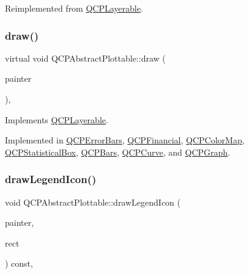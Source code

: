 Reimplemented from \mbox{\hyperlink{class_q_c_p_layerable_ae546370644a5551c76af739afc008bee}{Q\+C\+P\+Layerable}}.

\mbox{\label{class_q_c_p_abstract_plottable_a453f676a5cee7bf846c5f0fa05ea84b3}} 
\subsubsection{\texorpdfstring{draw()}{draw()}}
{\footnotesize\ttfamily virtual void Q\+C\+P\+Abstract\+Plottable\+::draw (\begin{DoxyParamCaption}\item[{\mbox{\hyperlink{class_q_c_p_painter}{Q\+C\+P\+Painter}} $\ast$}]{painter }\end{DoxyParamCaption})\hspace{0.3cm}{\ttfamily [protected]}, {}}



Implements \mbox{\hyperlink{class_q_c_p_layerable_aecf2f7087482d4b6a78cb2770e5ed12d}{Q\+C\+P\+Layerable}}.



Implemented in \mbox{\hyperlink{class_q_c_p_error_bars_a801e85931372abf2a1034bfb2eac5cd2}{Q\+C\+P\+Error\+Bars}}, \mbox{\hyperlink{class_q_c_p_financial_a4d62b7a618d609321adb5f5f1e31f446}{Q\+C\+P\+Financial}}, \mbox{\hyperlink{class_q_c_p_color_map_a6b628014d2939368935efd0a788648c8}{Q\+C\+P\+Color\+Map}}, \mbox{\hyperlink{class_q_c_p_statistical_box_afcff35fa79728cfe10e80e0702014fea}{Q\+C\+P\+Statistical\+Box}}, \mbox{\hyperlink{class_q_c_p_bars_aa267c20650d55084c3f47cb2f8fac9dc}{Q\+C\+P\+Bars}}, \mbox{\hyperlink{class_q_c_p_curve_ac199d41d23865cd68bd7b598308a4433}{Q\+C\+P\+Curve}}, and \mbox{\hyperlink{class_q_c_p_graph_a2b0849598f06e834b43ce18cd13bcdc3}{Q\+C\+P\+Graph}}.

\mbox{\label{class_q_c_p_abstract_plottable_a9a450783fd9ed539e589999fd390cdf7}} 
\subsubsection{\texorpdfstring{drawLegendIcon()}{drawLegendIcon()}}
{\footnotesize\ttfamily void Q\+C\+P\+Abstract\+Plottable\+::draw\+Legend\+Icon (\begin{DoxyParamCaption}\item[{\mbox{\hyperlink{class_q_c_p_painter}{Q\+C\+P\+Painter}} $\ast$}]{painter,  }\item[{const Q\+RectF \&}]{rect }\end{DoxyParamCaption}) const\hspace{0.3cm}{\ttfamily [protected]}, {}}



